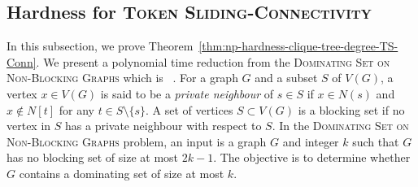 
\label{sec:max-clique-tree-degree}

\subsection{Hardness for \textsc{Token Sliding-Connectivity}}

In this subsection, we prove Theorem~\ref{thm:np-hardness-clique-tree-degree-TS-Conn}.
We present a polynomial time reduction from the
\textsc{Dominating Set on Non-Blocking Graphs}
which is \NPH~\cite{DBLP:conf/wg/BonamyB17}.
For a graph $G$ and a subset $S$ of $V(G)$, a vertex $x\in V(G)$ is said to 
be a \emph{private neighbour} of $s\in S$ if $x\in N(s)$ and 
$x\notin N[t]$ for any $t\in S\setminus \{s\}$. 
A set of vertices $S\subset V(G)$ is a blocking set if no vertex in $S$ 
has a private neighbour with respect to $S$. 
In the \textsc{Dominating Set on Non-Blocking Graphs} problem,
an input is a graph $G$ and integer $k$ such that $G$ has no blocking set of size at most $2k-1$.
The objective is to determine whether $G$ contains a dominating set
of size at most $k$.

